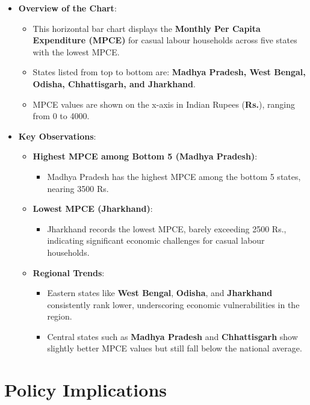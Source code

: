 \documentclass{article}
\begin{document}
\begin{itemize}
	\item \textbf{Overview of the Chart}:
	\begin{itemize}
		\item This horizontal bar chart displays the \textbf{Monthly Per Capita Expenditure (MPCE)} for casual labour households across five states with the lowest MPCE.
		\item States listed from top to bottom are: \textbf{Madhya Pradesh, West Bengal, Odisha, Chhattisgarh, and Jharkhand}.
		\item MPCE values are shown on the x-axis in Indian Rupees (\textbf{Rs.}), ranging from 0 to 4000.
	\end{itemize}
	\item \textbf{Key Observations}:
	\begin{itemize}
		\item \textbf{Highest MPCE among Bottom 5 (Madhya Pradesh)}:
		\begin{itemize}
			\item Madhya Pradesh has the highest MPCE among the bottom 5 states, nearing 3500 Rs.
		\end{itemize}
		\item \textbf{Lowest MPCE (Jharkhand)}:
		\begin{itemize}
			\item Jharkhand records the lowest MPCE, barely exceeding 2500 Rs., indicating significant economic challenges for casual labour households.
		\end{itemize}
		\item \textbf{Regional Trends}:
		\begin{itemize}
			\item Eastern states like \textbf{West Bengal}, \textbf{Odisha}, and \textbf{Jharkhand} consistently rank lower, underscoring economic vulnerabilities in the region.
			\item Central states such as \textbf{Madhya Pradesh} and \textbf{Chhattisgarh} show slightly better MPCE values but still fall below the national average.
		\end{itemize}
	\end{itemize}
\end{itemize}

\section*{Policy Implications}
\end{document}

